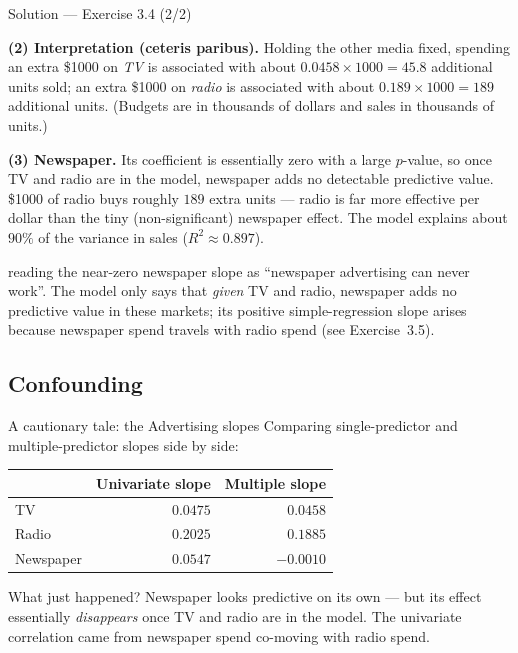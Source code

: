 \documentclass[aspectratio=169,11pt]{beamer}
\begin{document}
\begin{frame}{Solution --- Exercise 3.4 (2/2)}
  \begin{solutionbox}
    \textbf{(2) Interpretation (ceteris paribus).}
    Holding the other media fixed, spending an extra \$1000 on
    \emph{TV} is associated with about
    $0.0458\times 1000 = 45.8$ additional units sold; an extra \$1000 on
    \emph{radio} is associated with about
    $0.189\times 1000 = 189$ additional units. (Budgets are in
    thousands of dollars and sales in thousands of units.)

    \textbf{(3) Newspaper.} Its coefficient is essentially zero with a
    large $p$-value, so once TV and radio are in the model, newspaper
    adds no detectable predictive value. \$1000 of radio buys roughly
    $189$ extra units --- radio is far more effective per dollar than
    the tiny (non-significant) newspaper effect. The model explains
    about $90\%$ of the variance in sales ($R^2\approx 0.897$).
  \end{solutionbox}
  \begin{mistake}
    reading the near-zero newspaper slope as
    ``newspaper advertising can never work''. The model only says that
    \emph{given} TV and radio, newspaper adds no predictive value in
    these markets; its positive simple-regression slope arises because
    newspaper spend travels with radio spend (see Exercise~3.5).
  \end{mistake}
\end{frame}

\subsection{Confounding}

\begin{frame}{A cautionary tale: the Advertising slopes}
  Comparing single-predictor and multiple-predictor slopes side by side:
  \begin{center}
  \begin{tabular}{lrr}
    \toprule
    & Univariate slope & Multiple slope \\
    \midrule
    TV         & $\phantom{-}0.0475$ & $\phantom{-}0.0458$ \\
    Radio      & $\phantom{-}0.2025$ & $\phantom{-}0.1885$ \\
    Newspaper  & $\phantom{-}0.0547$ & $-0.0010$ \\
    \bottomrule
  \end{tabular}
  \end{center}
  \begin{alertblock}{What just happened?}
    Newspaper looks predictive on its own --- but its effect essentially
    \emph{disappears} once TV and radio are in the model. The univariate
    correlation came from newspaper spend co-moving with radio spend.
  \end{alertblock}
\end{frame}
\end{document}
